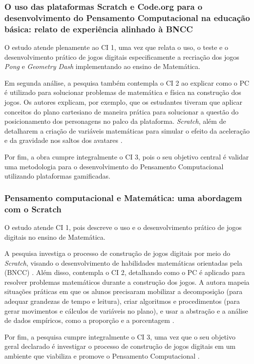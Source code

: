 \documentclass[12pt]{article}
\begin{document}
\subsubsection{O uso das plataformas Scratch e Code.org para o desenvolvimento do Pensamento Computacional na educação básica: relato de experiência alinhado à BNCC}

O estudo atende plenamente ao CI 1, uma vez que relata o uso, o teste e o desenvolvimento prático de jogos digitais especificamente a recriação dos jogos \textit{Pong} e \textit{Geometry Dash} implementando ao ensino de Matemática. 

Em segunda análise, a pesquisa também contempla o CI 2 ao explicar como o PC é utilizado para solucionar problemas de matemática e física na construção dos jogos. Os autores explicam, por exemplo, que os estudantes tiveram que aplicar conceitos do plano cartesiano de maneira prática para solucionar a questão do posicionamento dos personagens no palco da plataforma. \textit{Scratch}, além de detalharem a criação de variáveis matemáticas para simular o efeito da aceleração e da gravidade nos saltos dos avatares \cite{filho2025}. 

Por fim, a obra cumpre integralmente o CI 3, pois o seu objetivo central é validar uma metodologia para o desenvolvimento do Pensamento Computacional utilizando plataformas gamificadas.

\subsubsection{Pensamento computacional e Matemática: uma abordagem com o Scratch}
O estudo atende CI 1, pois descreve  o uso e o desenvolvimento prático de jogos digitais no ensino de Matemática. 

A pesquisa investiga o processo de construção de jogos digitais por meio do \textit{Scratch}, visando o desenvolvimento de habilidades matemáticas orientadas pela (BNCC) \cite{bessa2020}. Além disso, contempla o CI 2, detalhando como o PC é aplicado para resolver problemas matemáticos durante a construção dos jogos. A autora mapeia situações práticas em que os alunos precisaram mobilizar a decomposição (para adequar grandezas de tempo e leitura), criar algoritmos e procedimentos (para gerar movimentos e cálculos de variáveis no plano), e usar a abstração e a análise de dados empíricos, como a proporção e a porcentagem \cite{bessa2020}. 

Por fim, a pesquisa cumpre integralmente o CI 3, uma vez que o seu objetivo geral declarado é investigar o processo de construção de jogos digitais em um ambiente que viabiliza e promove o Pensamento Computacional \cite{bessa2020}.
\end{document}
